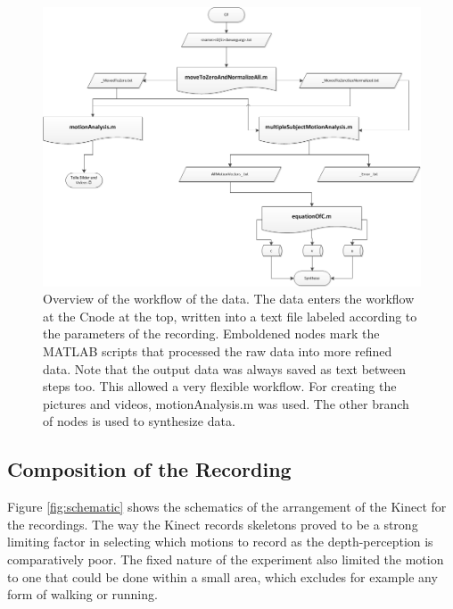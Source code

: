 \documentclass[a4paper]{article}
\newcommand{\CS}{C\nolinebreak\hspace{-.05em}\raisebox{.6ex}{\scriptsize\bf \#\ }}
\begin{document}
\begin{figure}
	\centering
	\includegraphics[width=16cm]{matlabaufbau.png}
	\caption{Overview of the workflow of the data. The data enters the workflow at the \CS node at the top, written into a text file labeled according to the parameters of the recording. Emboldened nodes mark the MATLAB scripts that processed the raw data into more refined data. Note that the output data was always saved as text between steps too. This allowed a very flexible workflow. For creating the pictures and videos, motionAnalysis.m was used. The other branch of nodes is used to synthesize data.}
	\label{fig:workflow}
\end{figure}

\subsection{Composition of the Recording}

Figure \ref{fig:schematic} shows the schematics of the arrangement of the Kinect for the recordings.
The way the Kinect records skeletons proved to be a strong limiting factor in selecting which motions to record as the depth-perception is comparatively poor.
The fixed nature of the experiment also limited the motion to one that could be done within a small area, which excludes for example any form of walking or running.
\end{document}
